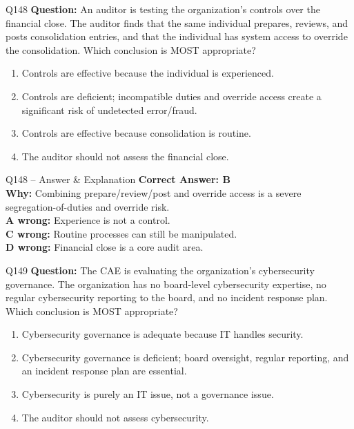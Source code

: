 \documentclass[aspectratio=169,10pt]{beamer}
\begin{document}
	\begin{frame}[t]{Q148}
		\small
		\textbf{Question:} An auditor is testing the organization's controls over the financial close. The auditor finds that the same individual prepares, reviews, and posts consolidation entries, and that the individual has system access to override the consolidation. Which conclusion is MOST appropriate?
		\begin{enumerate}[label=\Alph*.,itemsep=1pt,topsep=2pt]
			\item Controls are effective because the individual is experienced.
			\item Controls are deficient; incompatible duties and override access create a significant risk of undetected error/fraud.
			\item Controls are effective because consolidation is routine.
			\item The auditor should not assess the financial close.
		\end{enumerate}
	\end{frame}
	
	\begin{frame}[t]{Q148 -- Answer \& Explanation}
		\small
		\textbf{Correct Answer: B} \\[4pt]
		\textbf{Why:} Combining prepare/review/post and override access is a severe segregation-of-duties and override risk. \\[4pt]
		\textbf{A wrong:} Experience is not a control. \\[2pt]
		\textbf{C wrong:} Routine processes can still be manipulated. \\[2pt]
		\textbf{D wrong:} Financial close is a core audit area.
	\end{frame}
	
	\begin{frame}[t]{Q149}
		\small
		\textbf{Question:} The CAE is evaluating the organization's cybersecurity governance. The organization has no board-level cybersecurity expertise, no regular cybersecurity reporting to the board, and no incident response plan. Which conclusion is MOST appropriate?
		\begin{enumerate}[label=\Alph*.,itemsep=1pt,topsep=2pt]
			\item Cybersecurity governance is adequate because IT handles security.
			\item Cybersecurity governance is deficient; board oversight, regular reporting, and an incident response plan are essential.
			\item Cybersecurity is purely an IT issue, not a governance issue.
			\item The auditor should not assess cybersecurity.
		\end{enumerate}
	\end{frame}
	
\end{document}
